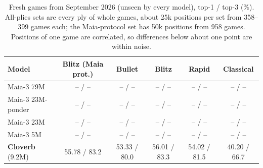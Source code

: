 \begin{table}[t]\centering\small
\caption{Fresh games from September 2026 (unseen by every model), top-1 / top-3 (\%). All-plies sets are every ply of whole games, about 25k positions per set from 358--399 games each; the Maia-protocol set has 50k positions from 958 games. Positions of one game are correlated, so differences below about one point are within noise.}\label{tab:fresh}
\begin{tabular}{lccccc}\toprule
Model & Blitz (Maia prot.) & Bullet & Blitz & Rapid & Classical\\\midrule
Maia-3 79M & -- / -- & -- / -- & -- / -- & -- / -- & -- / -- \\
Maia-3 23M-ponder & -- / -- & -- / -- & -- / -- & -- / -- & -- / -- \\
Maia-3 23M & -- / -- & -- / -- & -- / -- & -- / -- & -- / -- \\
Maia-3 5M & -- / -- & -- / -- & -- / -- & -- / -- & -- / -- \\
\textbf{Cloverb} (9.2M) & 55.78 / 83.2 & 53.33 / 80.0 & 56.01 / 83.3 & 54.02 / 81.5 & 40.20 / 66.7 \\
\bottomrule\end{tabular}\end{table}
